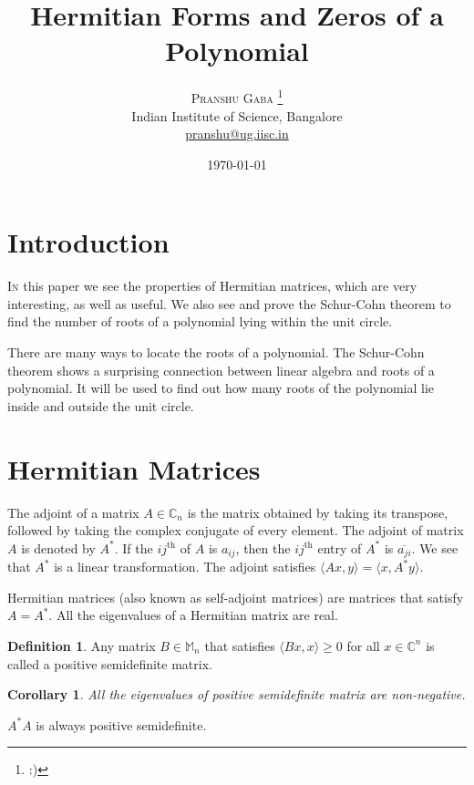 \documentclass[twofold, twocolumn]{article}
\author{%
\textsc{Pranshu Gaba} \thanks{:)} \\[1ex]
\normalsize Indian Institute of Science, Bangalore \\
\normalsize \href{mailto:pranshu@ug.iisc.in}{pranshu@ug.iisc.in}}
\title{Hermitian Forms and Zeros of a Polynomial}
\date{\today}
\newcommand*\conj[1]{\overline{#1}}
\newcommand*\adj[1]{#1^*}
\theoremstyle{plain}
\newtheorem*{corollary}{Corollary}
\theoremstyle{definition}
\newtheorem*{definition}{Definition}
\begin{document}
\maketitle

\section{Introduction}

\lettrine[nindent=0em,lines=2]{I}n this paper we see the properties of Hermitian matrices, which are very interesting, as well as useful. We also see and prove the Schur-Cohn theorem to find the number of roots of a polynomial lying within the unit circle. 

There are many ways to locate the roots of a polynomial. The Schur-Cohn theorem shows a surprising connection between linear algebra and roots of a polynomial. It will be used to find out how many roots of the polynomial lie inside and outside the unit circle.


\section{Hermitian Matrices}

The adjoint of a matrix \(A \in \mathbb{C}_n\) is the matrix obtained by taking its transpose, followed by taking the complex conjugate of every element. The adjoint of matrix \(A\) is denoted by \(\adj{A}\). If the \(ij^{\text{th}} \) of \(A\) is \(a_{ij}\), then the \(ij^{\text{th}}\) entry of \(\adj{A}\) is \(\conj{a_{ji}}\). We see that \(\adj{A}\) is a linear transformation. The adjoint satisfies \(\langle Ax, y \rangle = \langle x, \adj{A}y \rangle\). 

Hermitian matrices (also known as self-adjoint matrices) are matrices that satisfy \(A = \adj{A}\). All the eigenvalues of a Hermitian matrix are real. 

\begin{definition} Any matrix \(B \in \mathbb{M}_n\) that satisfies \(\langle Bx, x\rangle \ge 0\) for all \(x \in \mathbb{C}^n\) is called a positive semidefinite matrix. \end{definition}

\begin{corollary}All the eigenvalues of positive semidefinite matrix are non-negative. \end{corollary}




\(\adj{A} A\) is always positive semidefinite. 
\end{document}
